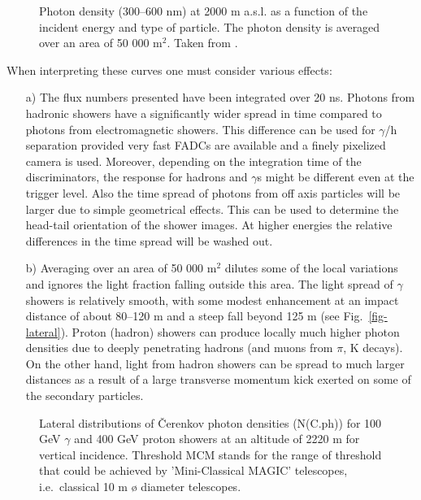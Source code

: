 \begin{figure}
\leavevmode
\centering
\epsfxsize=12cm
\caption{Photon density (300--600 nm) at 2000 m a.s.l. as a 
function of the incident energy and type of
particle. The photon density is averaged over an area
of 50 000 m$^2$. Taken from \cite{chantel:97}.}
\label{fig:3.1}
\end{figure} 

When interpreting these curves one must consider various effects:
\begin{itemize}
\item[a)]
The flux numbers presented have been integrated over 20 ns.
Photons from hadronic showers 
have a significantly wider spread in time compared to
photons from electromagnetic 
showers. This difference can be used for $\gamma$/h separation provided
very fast FADCs are available 
and a finely pixelized camera is used. Moreover, depending
on the integration time of the
discriminators, the response for hadrons and $\gamma$s might
be different even at the trigger 
level. Also the time spread of photons from off axis 
particles will be larger due to 
simple geometrical effects. This can be used to determine
the head-tail orientation of the
shower images. At higher energies the relative 
differences in the time spread will be washed out.
\item[b)]
Averaging over an area of 50 000 m$^2$ dilutes some of
the local variations and 
ignores the light fraction falling outside this area. 
The light spread of $\gamma$ showers is 
relatively smooth, with some modest enhancement at an
impact distance of about 80--120 m
and a steep fall beyond 125 m (see Fig.~\ref{fig-lateral}). Proton 
(hadron) showers can produce 
locally much higher photon densities due to deeply 
penetrating hadrons (and muons 
from $\pi$, K decays). On the other hand, light from hadron
showers can be spread to much 
larger distances as a result of a large transverse momentum 
kick exerted on some of the secondary particles. 
\end{itemize}

\begin{figure}[htb]
\begin{center}
\caption{Lateral distributions of \v{C}erenkov photon densities
(N(C.ph)) for
100 GeV $\gamma$ and 400 GeV proton showers at an altitude of 2220 m
for vertical incidence. Threshold MCM stands for 
the range of threshold that could be achieved
by 'Mini-Classical MAGIC' telescopes,
i.e.\ classical 10 m {\o} diameter telescopes.}
\label{fig-lateral}\label{fig:3.2}
\end{center}
\end{figure}

